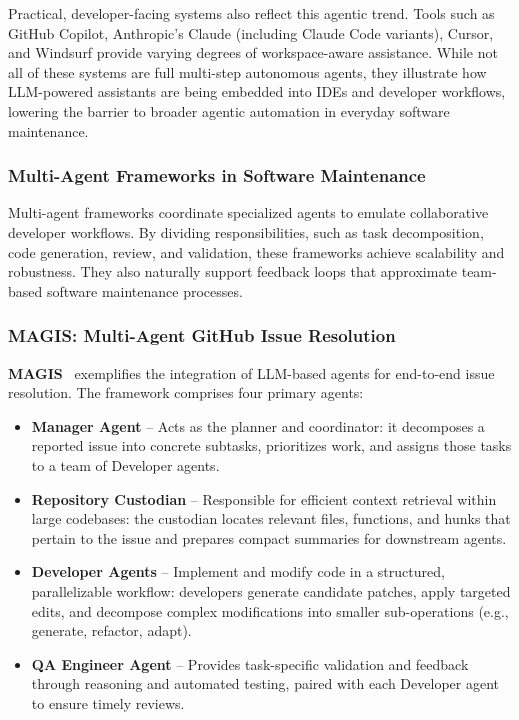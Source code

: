 Practical, developer-facing systems also reflect this agentic trend. Tools such as GitHub Copilot, Anthropic's Claude (including Claude Code variants), Cursor, and Windsurf provide varying degrees of workspace-aware assistance. While not all of these systems are full multi-step autonomous agents, they illustrate how LLM-powered assistants are being embedded into IDEs and developer workflows, lowering the barrier to broader agentic automation in everyday software maintenance.

\subsubsection*{Multi-Agent Frameworks in Software Maintenance}
Multi-agent frameworks coordinate specialized agents to emulate collaborative developer workflows. By dividing responsibilities, such as task decomposition, code generation, review, and validation, these frameworks achieve scalability and robustness. They also naturally support feedback loops that approximate team-based software maintenance processes.

\subsubsection{MAGIS: Multi-Agent GitHub Issue Resolution}
\textbf{MAGIS}~\cite{magis} exemplifies the integration of LLM-based agents for end-to-end issue resolution. The framework comprises four primary agents:

\begin{itemize}
    \item \textbf{Manager Agent} -- Acts as the planner and coordinator: it decomposes a reported issue into concrete subtasks, prioritizes work, and assigns those tasks to a team of Developer agents.
    \item \textbf{Repository Custodian} -- Responsible for efficient context retrieval within large codebases: the custodian locates relevant files, functions, and hunks that pertain to the issue and prepares compact summaries for downstream agents.
    \item \textbf{Developer Agents} -- Implement and modify code in a structured, parallelizable workflow: developers generate candidate patches, apply targeted edits, and decompose complex modifications into smaller sub-operations (e.g., generate, refactor, adapt). 
    \item \textbf{QA Engineer Agent} -- Provides task-specific validation and feedback through reasoning and automated testing, paired with each Developer agent to ensure timely reviews. 
\end{itemize}

